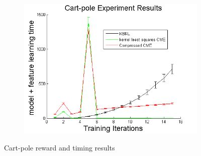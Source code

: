 \documentclass[letterpaper]{article}
\begin{document}
\begin{figure}[htb]
\begin{subfigure}[b]{0.3\textwidth}
\includegraphics[width=\textwidth]{CPmodelfeature.png}
\end{subfigure}
\caption{Cart-pole reward and timing results}
  \label{CPfigs}
\end{figure}
\end{document}
